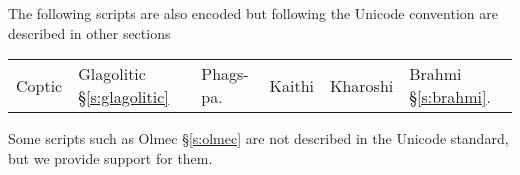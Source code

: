 The following scripts are also encoded but following the Unicode
convention are described in other sections

\begin{center}
\begin{tabular}{llllll}
Coptic &Glagolitic \S\ref{s:glagolitic} &Phags-pa. &Kaithi &Kharoshi &Brahmi \S\ref{s:brahmi}.\\
\end{tabular}
\end{center}

Some scripts such as Olmec \S\ref{s:olmec} are not described in the Unicode standard, but we provide support for them.

%

%
















%












\ifscriptolmec
  
\fi
